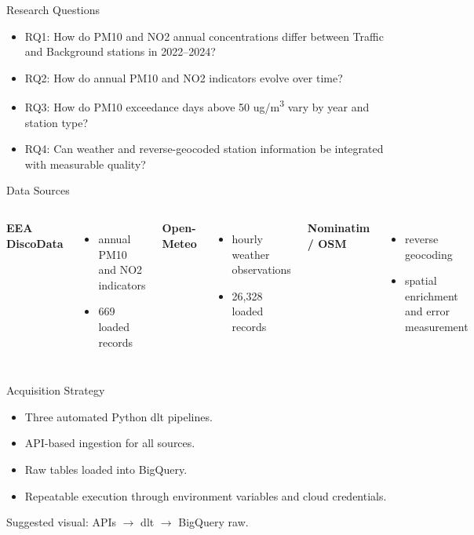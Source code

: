 \documentclass[aspectratio=169]{beamer}
\begin{document}
\begin{frame}{Research Questions}
\begin{itemize}
  \item RQ1: How do PM10 and NO2 annual concentrations differ between Traffic and Background stations in 2022--2024?
  \item RQ2: How do annual PM10 and NO2 indicators evolve over time?
  \item RQ3: How do PM10 exceedance days above 50 ug/m\textsuperscript{3} vary by year and station type?
  \item RQ4: Can weather and reverse-geocoded station information be integrated with measurable quality?
\end{itemize}
\end{frame}

\begin{frame}{Data Sources}
\begin{columns}[T]
  \textbf{EEA DiscoData}
  \begin{itemize}
    \item annual PM10 and NO2 indicators
    \item 669 loaded records
  \end{itemize}

  \textbf{Open-Meteo}
  \begin{itemize}
    \item hourly weather observations
    \item 26,328 loaded records
  \end{itemize}

  \textbf{Nominatim / OSM}
  \begin{itemize}
    \item reverse geocoding
    \item spatial enrichment and error measurement
  \end{itemize}
\end{columns}
\end{frame}

\begin{frame}{Acquisition Strategy}
\begin{itemize}
  \item Three automated Python dlt pipelines.
  \item API-based ingestion for all sources.
  \item Raw tables loaded into BigQuery.
  \item Repeatable execution through environment variables and cloud credentials.
\end{itemize}

\vspace{0.4cm}
Suggested visual: APIs $\rightarrow$ dlt $\rightarrow$ BigQuery raw.
\end{frame}
\end{document}

